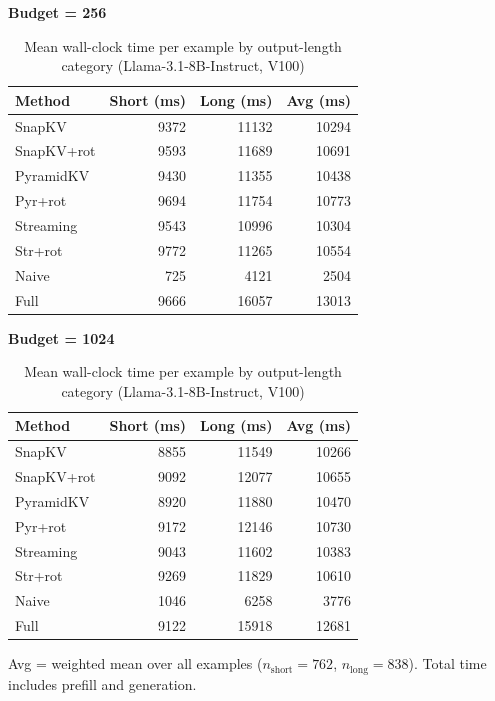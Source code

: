 \documentclass[10pt,letterpaper]{article}
\begin{document}
\begin{table}[H]
\centering
\small
\caption{Mean wall-clock time per example by output-length category (Llama-3.1-8B-Instruct, V100)}
\label{tab:instruct-timing}
\begin{minipage}[t]{0.47\textwidth}
\centering
\textbf{Budget = 256}\\[4pt]
\begin{tabular}{@{}lrrr@{}}
\toprule
Method & Short (ms) & Long (ms) & Avg (ms)\\
\midrule
SnapKV     &  9372 & 11132 & 10294\\
SnapKV+rot &  9593 & 11689 & 10691\\
PyramidKV  &  9430 & 11355 & 10438\\
Pyr+rot    &  9694 & 11754 & 10773\\
Streaming  &  9543 & 10996 & 10304\\
Str+rot    &  9772 & 11265 & 10554\\
Naive      &   725 &  4121 &  2504\\
Full       &  9666 & 16057 & 13013\\
\bottomrule
\end{tabular}
\end{minipage}
\hfill
\begin{minipage}[t]{0.47\textwidth}
\centering
\textbf{Budget = 1024}\\[4pt]
\begin{tabular}{@{}lrrr@{}}
\toprule
Method & Short (ms) & Long (ms) & Avg (ms)\\
\midrule
SnapKV     &  8855 & 11549 & 10266\\
SnapKV+rot &  9092 & 12077 & 10655\\
PyramidKV  &  8920 & 11880 & 10470\\
Pyr+rot    &  9172 & 12146 & 10730\\
Streaming  &  9043 & 11602 & 10383\\
Str+rot    &  9269 & 11829 & 10610\\
Naive      &  1046 &  6258 &  3776\\
Full       &  9122 & 15918 & 12681\\
\bottomrule
\end{tabular}
\end{minipage}

\medskip
Avg = weighted mean over all examples ($n_{\text{short}}=762$, $n_{\text{long}}=838$).
Total time includes prefill and generation.
\end{table}
\end{document}
